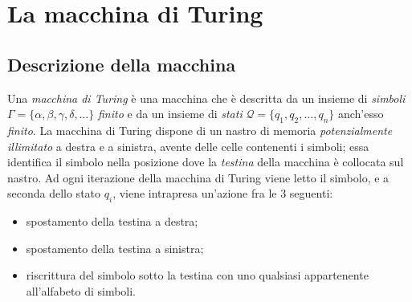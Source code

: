 \documentclass[10pt]{book}
\begin{document}
\setmonofont[Scale=.85]{Fira Code Retina}



\setlength{\headsep}{30pt}
\setlength{\footskip}{40pt}
\setlength{\marginparsep}{20pt}
\setlength{\marginparwidth}{60pt}

\tableofcontents

\chapter{La macchina di Turing}
\section{Descrizione della macchina}

Una \emph{macchina di Turing} è una macchina che è descritta da un insieme di
\emph{simboli} $\Gamma = \{\alpha, \beta, \gamma, \delta, \dots\}$ \emph{finito} e da
un insieme di \emph{stati} $\mathcal{Q} = \{q_1, q_2, \dots, q_n\}$ anch'esso
\emph{finito}. La macchina di Turing dispone di un nastro di memoria \emph{potenzialmente
illimitato} a destra e a sinistra, avente delle celle contenenti i simboli;
essa identifica il simbolo nella posizione dove la
\emph{testina} della macchina è collocata sul nastro. Ad ogni iterazione della
macchina di Turing viene letto il simbolo, e a seconda dello stato $q_i$, viene
intrapresa un'azione fra le $3$ seguenti:
\begin{itemize}
    \item spostamento della testina a destra;
    \item spostamento della testina a sinistra;
    \item riscrittura del simbolo sotto la testina con uno qualsiasi
        appartenente all'alfabeto di simboli.
\end{itemize}
\end{document}
